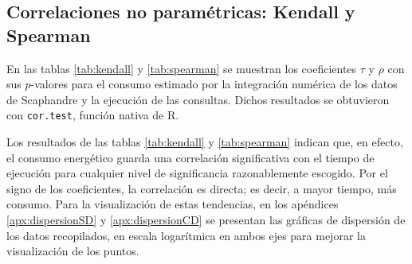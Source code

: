 \documentclass[12pt, letter paper]{report}
\begin{document}
      \subsection{Correlaciones no paramétricas: Kendall y Spearman} %
      \label{sub:correlaciones_no_paramétricas_kendall_y_spearman}
        En las tablas \ref{tab:kendall} y \ref{tab:spearman} se muestran los
        coeficientes $\tau$ y $\rho$ con sus $p$-valores para el consumo
        estimado por la integración numérica de los datos de Scaphandre y la
        ejecución de las consultas. Dichos resultados se obtuvieron con
        \texttt{cor.test}, función nativa de R.

        Los resultados de las tablas \ref{tab:kendall} y \ref{tab:spearman}
        indican que, en efecto, el consumo energético guarda una correlación
        significativa con el tiempo de ejecución para cualquier nivel de
        significancia razonablemente escogido. Por el signo de los coeficientes,
        la correlación es directa; es decir, a mayor tiempo, más consumo. Para
        la visualización de estas tendencias, en los apéndices
        \ref{apx:dispersionSD} y \ref{apx:dispersionCD} se presentan las
        gráficas de dispersión de los datos recopilados, en escala logarítmica
        en ambos ejes para mejorar la visualización de los puntos.
\end{document}
